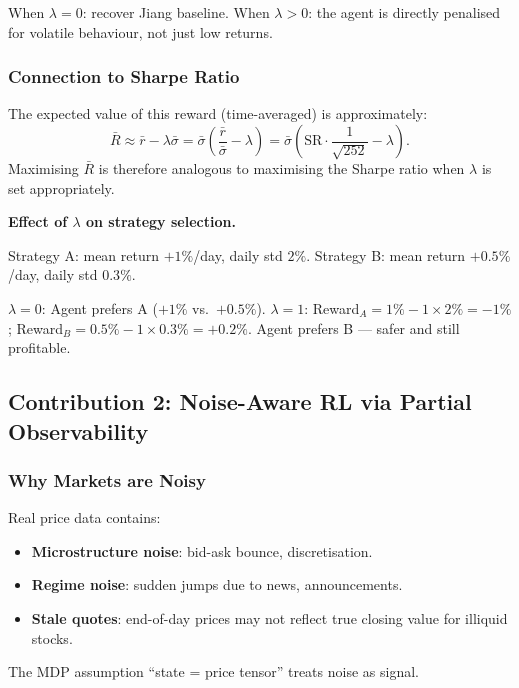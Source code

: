 \documentclass[12pt,a4paper]{article}
\begin{document}
When $\lambda = 0$: recover Jiang baseline.
When $\lambda > 0$: the agent is directly penalised for volatile behaviour,
not just low returns.

\subsubsection*{Connection to Sharpe Ratio}

The expected value of this reward (time-averaged) is approximately:
\begin{equation}
  \bar{R} \approx \bar{r} - \lambda \bar{\sigma}
  = \bar{\sigma}\!\left(\frac{\bar{r}}{\bar{\sigma}} - \lambda\right)
  = \bar{\sigma}\!\left(\text{SR} \cdot \frac{1}{\sqrt{252}} - \lambda\right).
\end{equation}
Maximising $\bar{R}$ is therefore analogous to maximising the Sharpe ratio
when $\lambda$ is set appropriately.

\begin{exbox}
\textbf{Effect of $\lambda$ on strategy selection.}

Strategy A: mean return $+1\%$/day, daily std $2\%$.
Strategy B: mean return $+0.5\%$/day, daily std $0.3\%$.

$\lambda=0$: Agent prefers A ($+1\%$ vs.\ $+0.5\%$).
$\lambda=1$: Reward$_A = 1\% - 1\times 2\% = -1\%$;
            Reward$_B = 0.5\% - 1\times 0.3\% = +0.2\%$.
Agent prefers B --- safer and still profitable.
\end{exbox}

\subsection{Contribution 2: Noise-Aware RL via Partial Observability}

\subsubsection*{Why Markets are Noisy}

Real price data contains:
\begin{itemize}[nosep]
  \item \textbf{Microstructure noise}: bid-ask bounce, discretisation.
  \item \textbf{Regime noise}: sudden jumps due to news, announcements.
  \item \textbf{Stale quotes}: end-of-day prices may not reflect true
        closing value for illiquid stocks.
\end{itemize}
The MDP assumption ``state = price tensor'' treats noise as signal.
\end{document}
